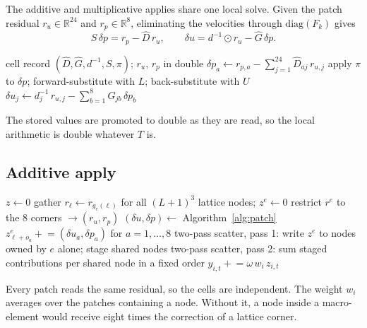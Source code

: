 \documentclass[11pt,a4paper]{article}
\newcommand{\code}[1]{\texttt{\small #1}}
\begin{document}
The additive and multiplicative applies share one local solve. Given the patch residual
$r_u \in \mathbb{R}^{24}$ and $r_p \in \mathbb{R}^{8}$, eliminating the velocities through
$\mathrm{diag}(F_k)$ gives
\begin{equation}
S\,\delta p = r_p - \hat D\, r_u, \qquad
\delta u = d^{-1} \odot r_u - \hat G\, \delta p .
\label{eq:patchsolve}
\end{equation}

\begin{algorithm}[H]
\caption{Patch solve}\label{alg:patch}
\begin{algorithmic}[1]
\Require cell record $(\hat D, \hat G, d^{-1}, S, \pi)$; $r_u$, $r_p$ in double
\State $\delta p_a \gets r_{p,a} - \sum_{j=1}^{24} \hat D_{a j}\, r_{u,j}$
\State apply $\pi$ to $\delta p$; forward-substitute with $L$; back-substitute with $U$
\State $\delta u_j \gets d^{-1}_j\, r_{u,j} - \sum_{b=1}^{8} \hat G_{j b}\, \delta p_b$
\end{algorithmic}
\end{algorithm}
The stored values are promoted to double as they are read, so the local arithmetic is
double whatever $T$ is.

\subsection{Additive apply}

\begin{algorithm}[H]
\caption{Additive Vanka, \code{vanka\_apply}: $y \gets y + \omega\, W \sum_k R_k^{\mathsf T}
\hat{\mathcal A}_k^{-1} R_k\, r$}\label{alg:add}
\begin{algorithmic}[1]
\State $z \gets 0$
  \State gather $r_\ell \gets r_{g_e(\ell)}$ for all $(L+1)^3$ lattice nodes; $z^{e} \gets 0$
    \State restrict $r^e$ to the 8 corners $\to (r_u, r_p)$
    \State $(\delta u, \delta p) \gets$ Algorithm~\ref{alg:patch}
    \State $z^e_{\ell + o_a} \mathrel{+}= (\delta u_a, \delta p_a)$ for $a = 1,\dots,8$
  \EndFor
  \State two-pass scatter, pass 1: write $z^e$ to nodes owned by $e$ alone; stage shared nodes
\EndFor
\State two-pass scatter, pass 2: sum staged contributions per shared node in a fixed order
  \State $y_{i,t} \mathrel{+}= \omega\, w_i\, z_{i,t}$
\EndFor
\end{algorithmic}
\end{algorithm}
Every patch reads the same residual, so the cells are independent. The weight $w_i$ averages
over the patches containing a node. Without it, a node inside a macro-element would receive
eight times the correction of a lattice corner.
\end{document}
